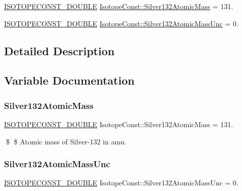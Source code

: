 \begin{DoxyCompactItemize}
\item 
\mbox{\hyperlink{group___isotope_const-_macros_ga8f45a7272ce02c0b4c65c44636ed719a}{I\+S\+O\+T\+O\+P\+E\+C\+O\+N\+S\+T\+\_\+\+D\+O\+U\+B\+LE}} \mbox{\hyperlink{group___isotope_const-_silver-_ag132_gab196734373d5f299b8c55713586cac07}{Isotope\+Const\+::\+Silver132\+Atomic\+Mass}} = 131.
\item 
\mbox{\hyperlink{group___isotope_const-_macros_ga8f45a7272ce02c0b4c65c44636ed719a}{I\+S\+O\+T\+O\+P\+E\+C\+O\+N\+S\+T\+\_\+\+D\+O\+U\+B\+LE}} \mbox{\hyperlink{group___isotope_const-_silver-_ag132_gac09ea11876125f160e3d583787051788}{Isotope\+Const\+::\+Silver132\+Atomic\+Mass\+Unc}} = 0.
\end{DoxyCompactItemize}


\subsection{Detailed Description}


\subsection{Variable Documentation}
\mbox{\label{group___isotope_const-_silver-_ag132_gab196734373d5f299b8c55713586cac07}} 
\subsubsection{\texorpdfstring{Silver132\+Atomic\+Mass}{Silver132AtomicMass}}
{\footnotesize\ttfamily \mbox{\hyperlink{group___isotope_const-_macros_ga8f45a7272ce02c0b4c65c44636ed719a}{I\+S\+O\+T\+O\+P\+E\+C\+O\+N\+S\+T\+\_\+\+D\+O\+U\+B\+LE}} Isotope\+Const\+::\+Silver132\+Atomic\+Mass = 131.}

\$ \$ Atomic mass of Silver-\/132 in amu. \mbox{\label{group___isotope_const-_silver-_ag132_gac09ea11876125f160e3d583787051788}} 
\subsubsection{\texorpdfstring{Silver132\+Atomic\+Mass\+Unc}{Silver132AtomicMassUnc}}
{\footnotesize\ttfamily \mbox{\hyperlink{group___isotope_const-_macros_ga8f45a7272ce02c0b4c65c44636ed719a}{I\+S\+O\+T\+O\+P\+E\+C\+O\+N\+S\+T\+\_\+\+D\+O\+U\+B\+LE}} Isotope\+Const\+::\+Silver132\+Atomic\+Mass\+Unc = 0.}

